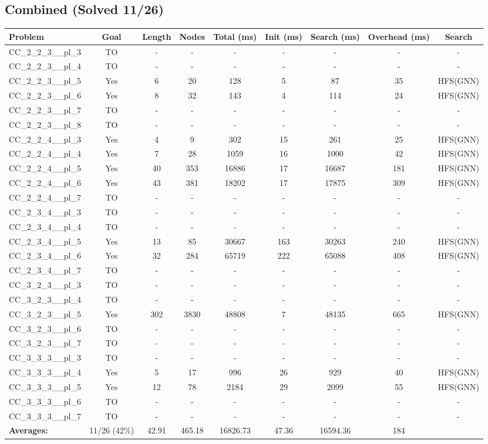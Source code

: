 \documentclass{article}
\begin{document}
\subsection*{Combined (Solved 11/26)}
\begin{tabular}{lcccccccc}
\toprule
Problem & Goal & Length & Nodes & Total (ms) & Init (ms) & Search (ms) & Overhead (ms) & Search \\
\midrule
CC\_2\_2\_3\_\_pl\_3 & TO & - & - & - & - & - & - & - \\
CC\_2\_2\_3\_\_pl\_4 & TO & - & - & - & - & - & - & - \\
CC\_2\_2\_3\_\_pl\_5 & Yes & 6 & 20 & 128 & 5 & 87 & 35 & HFS(GNN) \\
CC\_2\_2\_3\_\_pl\_6 & Yes & 8 & 32 & 143 & 4 & 114 & 24 & HFS(GNN) \\
CC\_2\_2\_3\_\_pl\_7 & TO & - & - & - & - & - & - & - \\
CC\_2\_2\_3\_\_pl\_8 & TO & - & - & - & - & - & - & - \\
CC\_2\_2\_4\_\_pl\_3 & Yes & 4 & 9 & 302 & 15 & 261 & 25 & HFS(GNN) \\
CC\_2\_2\_4\_\_pl\_4 & Yes & 7 & 28 & 1059 & 16 & 1000 & 42 & HFS(GNN) \\
CC\_2\_2\_4\_\_pl\_5 & Yes & 40 & 353 & 16886 & 17 & 16687 & 181 & HFS(GNN) \\
CC\_2\_2\_4\_\_pl\_6 & Yes & 43 & 381 & 18202 & 17 & 17875 & 309 & HFS(GNN) \\
CC\_2\_2\_4\_\_pl\_7 & TO & - & - & - & - & - & - & - \\
CC\_2\_3\_4\_\_pl\_3 & TO & - & - & - & - & - & - & - \\
CC\_2\_3\_4\_\_pl\_4 & TO & - & - & - & - & - & - & - \\
CC\_2\_3\_4\_\_pl\_5 & Yes & 13 & 85 & 30667 & 163 & 30263 & 240 & HFS(GNN) \\
CC\_2\_3\_4\_\_pl\_6 & Yes & 32 & 284 & 65719 & 222 & 65088 & 408 & HFS(GNN) \\
CC\_2\_3\_4\_\_pl\_7 & TO & - & - & - & - & - & - & - \\
CC\_3\_2\_3\_\_pl\_3 & TO & - & - & - & - & - & - & - \\
CC\_3\_2\_3\_\_pl\_4 & TO & - & - & - & - & - & - & - \\
CC\_3\_2\_3\_\_pl\_5 & Yes & 302 & 3830 & 48808 & 7 & 48135 & 665 & HFS(GNN) \\
CC\_3\_2\_3\_\_pl\_6 & TO & - & - & - & - & - & - & - \\
CC\_3\_2\_3\_\_pl\_7 & TO & - & - & - & - & - & - & - \\
CC\_3\_3\_3\_\_pl\_3 & TO & - & - & - & - & - & - & - \\
CC\_3\_3\_3\_\_pl\_4 & Yes & 5 & 17 & 996 & 26 & 929 & 40 & HFS(GNN) \\
CC\_3\_3\_3\_\_pl\_5 & Yes & 12 & 78 & 2184 & 29 & 2099 & 55 & HFS(GNN) \\
CC\_3\_3\_3\_\_pl\_6 & TO & - & - & - & - & - & - & - \\
CC\_3\_3\_3\_\_pl\_7 & TO & - & - & - & - & - & - & - \\
\textbf{Averages:} & 11/26 (42\%) & 42.91 & 465.18 & 16826.73 & 47.36 & 16594.36 & 184 & \\
\bottomrule
\end{tabular}
\\[0.7cm]
\end{document}
